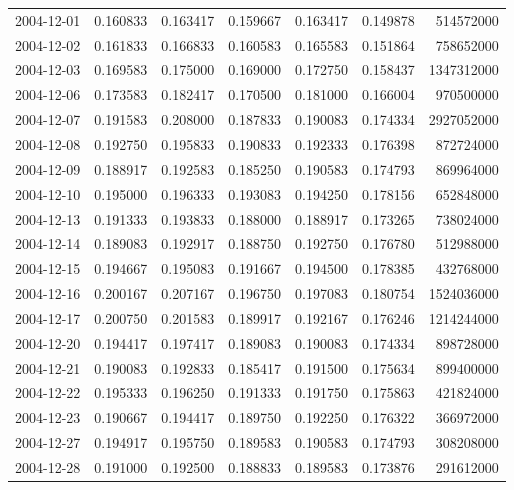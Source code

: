 \begin{tabular}{lrrrrrr}
2004-12-01 &    0.160833 &    0.163417 &    0.159667 &    0.163417 &    0.149878 &   514572000 \\
2004-12-02 &    0.161833 &    0.166833 &    0.160583 &    0.165583 &    0.151864 &   758652000 \\
2004-12-03 &    0.169583 &    0.175000 &    0.169000 &    0.172750 &    0.158437 &  1347312000 \\
2004-12-06 &    0.173583 &    0.182417 &    0.170500 &    0.181000 &    0.166004 &   970500000 \\
2004-12-07 &    0.191583 &    0.208000 &    0.187833 &    0.190083 &    0.174334 &  2927052000 \\
2004-12-08 &    0.192750 &    0.195833 &    0.190833 &    0.192333 &    0.176398 &   872724000 \\
2004-12-09 &    0.188917 &    0.192583 &    0.185250 &    0.190583 &    0.174793 &   869964000 \\
2004-12-10 &    0.195000 &    0.196333 &    0.193083 &    0.194250 &    0.178156 &   652848000 \\
2004-12-13 &    0.191333 &    0.193833 &    0.188000 &    0.188917 &    0.173265 &   738024000 \\
2004-12-14 &    0.189083 &    0.192917 &    0.188750 &    0.192750 &    0.176780 &   512988000 \\
2004-12-15 &    0.194667 &    0.195083 &    0.191667 &    0.194500 &    0.178385 &   432768000 \\
2004-12-16 &    0.200167 &    0.207167 &    0.196750 &    0.197083 &    0.180754 &  1524036000 \\
2004-12-17 &    0.200750 &    0.201583 &    0.189917 &    0.192167 &    0.176246 &  1214244000 \\
2004-12-20 &    0.194417 &    0.197417 &    0.189083 &    0.190083 &    0.174334 &   898728000 \\
2004-12-21 &    0.190083 &    0.192833 &    0.185417 &    0.191500 &    0.175634 &   899400000 \\
2004-12-22 &    0.195333 &    0.196250 &    0.191333 &    0.191750 &    0.175863 &   421824000 \\
2004-12-23 &    0.190667 &    0.194417 &    0.189750 &    0.192250 &    0.176322 &   366972000 \\
2004-12-27 &    0.194917 &    0.195750 &    0.189583 &    0.190583 &    0.174793 &   308208000 \\
2004-12-28 &    0.191000 &    0.192500 &    0.188833 &    0.189583 &    0.173876 &   291612000 \\

\end{tabular}
